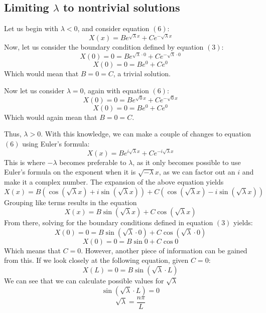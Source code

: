 \documentclass[a4paper]{article}
\begin{document}
        \subsection{Limiting $\lambda$ to nontrivial solutions}
            Let us begin with $\lambda < 0$, and consider equation $\left(6\right)$:
            \[
                X\left(x\right) = B e^{\sqrt{\lambda}x} + C e^{-\sqrt{\lambda}x}
            \]
            Now, let us consider the boundary condition defined by equation $\left(3\right)$:
            \[
                X\left(0\right) = 0 = B e^{\sqrt{\lambda} \cdot 0} + C e^{-\sqrt{\lambda} \cdot 0}
            \]
            \[
                X\left(0\right) = 0 = B e^{0} + C e^{0}
            \]
            Which would mean that $B = 0 = C$, a trivial solution.
            
            Now let us consider $\lambda = 0$, again with equation $\left(6\right)$:
            \[
                X\left(0\right) = 0 = B e^{\sqrt{0}x} + C e^{-\sqrt{0}x}
            \]
            \[
                X\left(0\right) = 0 = B e^{0} + C e^{0}
            \]
            Which would again mean that $B = 0 = C$.

            Thus, $\lambda > 0$. With this knowledge, we can make a couple of changes to equation $\left(6\right)$
            using Euler's formula:
            \[
                X\left(x\right) = B e^{i\sqrt{\lambda} x} + C e^{-i\sqrt{\lambda} x}
            \]
            This is where $-\lambda$ becomes preferable to $\lambda$, as it only becomes possible to use Euler's
            formula on the exponent when it is $\sqrt{-\lambda} x$, as we can factor out an $i$ and make it a
            complex number. The expansion of the above equation yields
            \[
                X\left(x\right) = B\left(\cos{\left(\sqrt\lambda x\right)} + i\sin{\left(\sqrt\lambda x\right)}\right) + C\left(\cos{\left(\sqrt\lambda x\right)} - i\sin{\left(\sqrt\lambda x\right)}\right)
            \]
            Grouping like terms results in the equation
            \[
                X\left(x\right) = B\sin{\left(\sqrt\lambda x\right)} + C\cos{\left(\sqrt\lambda x\right)}
            \]
            From there, solving for the boundary conditions defined in equation $\left(3\right)$ yields:
            \[
                X\left(0\right) = 0 = B\sin{\left(\sqrt\lambda \cdot 0\right)} + C\cos{\left(\sqrt\lambda \cdot 0\right)}
            \]
            \[
                X\left(0\right) = 0 = B\sin{0} + C\cos{0}
            \]
            Which means that $C = 0$. However, another piece of information can be gained from
            this. If we look closely at the following equation, given $C = 0$:
            \[
                X\left(L\right) = 0 = B\sin{\left(\sqrt\lambda \cdot L\right)}
            \]
            We can see that we can calculate possible values for $\sqrt\lambda$
            \[
                \sin{\left(\sqrt\lambda \cdot L\right)} = 0
            \]
            \[
                \sqrt\lambda = \frac{n \pi}{L}
            \]
\end{document}
